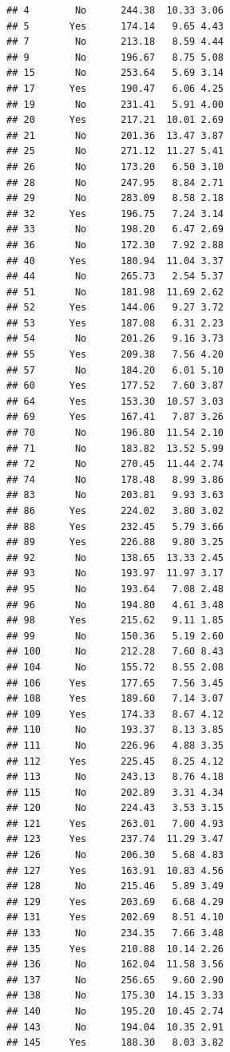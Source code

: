 \documentclass[
]{article}
\begin{document}
\begin{verbatim}
## 4        No      244.38  10.33 3.06
## 5       Yes      174.14   9.65 4.43
## 7        No      213.18   8.59 4.44
## 9        No      196.67   8.75 5.08
## 15       No      253.64   5.69 3.14
## 17      Yes      190.47   6.06 4.25
## 19       No      231.41   5.91 4.00
## 20      Yes      217.21  10.01 2.69
## 21       No      201.36  13.47 3.87
## 25       No      271.12  11.27 5.41
## 26       No      173.20   6.50 3.10
## 28       No      247.95   8.84 2.71
## 29       No      283.09   8.58 2.18
## 32      Yes      196.75   7.24 3.14
## 33       No      198.20   6.47 2.69
## 36       No      172.30   7.92 2.88
## 40      Yes      180.94  11.04 3.37
## 44       No      265.73   2.54 5.37
## 51       No      181.98  11.69 2.62
## 52      Yes      144.06   9.27 3.72
## 53      Yes      187.08   6.31 2.23
## 54       No      201.26   9.16 3.73
## 55      Yes      209.38   7.56 4.20
## 57       No      184.20   6.01 5.10
## 60      Yes      177.52   7.60 3.87
## 64      Yes      153.30  10.57 3.03
## 69      Yes      167.41   7.87 3.26
## 70       No      196.80  11.54 2.10
## 71       No      183.82  13.52 5.99
## 72       No      270.45  11.44 2.74
## 74       No      178.48   8.99 3.86
## 83       No      203.81   9.93 3.63
## 86      Yes      224.02   3.80 3.02
## 88      Yes      232.45   5.79 3.66
## 89      Yes      226.88   9.80 3.25
## 92       No      138.65  13.33 2.45
## 93       No      193.97  11.97 3.17
## 95       No      193.64   7.08 2.48
## 96       No      194.80   4.61 3.48
## 98      Yes      215.62   9.11 1.85
## 99       No      150.36   5.19 2.60
## 100      No      212.28   7.60 8.43
## 104      No      155.72   8.55 2.08
## 106     Yes      177.65   7.56 3.45
## 108     Yes      189.60   7.14 3.07
## 109     Yes      174.33   8.67 4.12
## 110      No      193.37   8.13 3.85
## 111      No      226.96   4.88 3.35
## 112     Yes      225.45   8.25 4.12
## 113      No      243.13   8.76 4.18
## 115      No      202.89   3.31 4.34
## 120      No      224.43   3.53 3.15
## 121     Yes      263.01   7.00 4.93
## 123     Yes      237.74  11.29 3.47
## 126      No      206.30   5.68 4.83
## 127     Yes      163.91  10.83 4.56
## 128      No      215.46   5.89 3.49
## 129     Yes      203.69   6.68 4.29
## 131     Yes      202.69   8.51 4.10
## 133      No      234.35   7.66 3.48
## 135     Yes      210.88  10.14 2.26
## 136      No      162.04  11.58 3.56
## 137      No      256.65   9.60 2.90
## 138      No      175.30  14.15 3.33
## 140      No      195.20  10.45 2.74
## 143      No      194.04  10.35 2.91
## 145     Yes      188.30   8.03 3.82

\end{verbatim}
\end{document}
